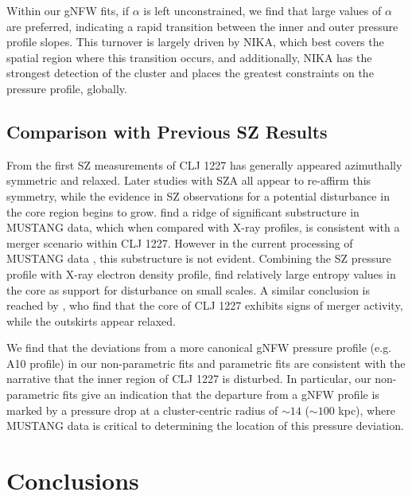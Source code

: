 \documentclass[twocolumn,traditabstract]{aa}
\begin{document}
Within our gNFW fits, if $\alpha$ is left unconstrained, we find that large values of $\alpha$ are preferred,
indicating a rapid transition between the inner and outer pressure profile slopes. This turnover is largely
driven by NIKA, which best covers the spatial region where this transition occurs, and additionally, NIKA
has the strongest detection of the cluster and places the greatest constraints on the pressure profile, globally.

\subsection{Comparison with Previous SZ Results}
\label{sec:prev_res}

From the first SZ measurements of CLJ 1227 \citep[made with BIMA][]{joy2001} has generally appeared
azimuthally symmetric and relaxed. Later studies with SZA \citep{muchovej2007,mroczkowski2009,mroczkowski2011}
all appear to re-affirm this symmetry, while the evidence in SZ observations for a potential disturbance
in the core region begins to grow. \citet{korngut2011} find a ridge of significant substructure in
MUSTANG data, which when compared with X-ray profiles, is consistent with a merger scenario within
CLJ 1227. However in the current processing of MUSTANG data \citep{romero2016},
this substructure is not evident. Combining the SZ pressure profile with X-ray electron density profile,
\citet{adam2015} find relatively large entropy values in the core as support for disturbance on small scales.
A similar conclusion is reached by \citet{rumsey2016}, who find that the core
of CLJ 1227 exhibits signs of merger activity, while the outskirts appear relaxed.

We find that the deviations from a more canonical gNFW pressure profile (e.g. A10 profile) in our
non-parametric fits and parametric fits are consistent with the narrative that the inner region of
CLJ 1227 is disturbed. In particular, our non-parametric fits give an indication that the departure
from a gNFW profile is marked by a pressure drop at a cluster-centric radius of $\sim 14$\asecs
($\sim 100$ kpc), where MUSTANG data is critical to determining the location of this pressure deviation.


\section{Conclusions}
\label{sec:conclusions}
\end{document}
